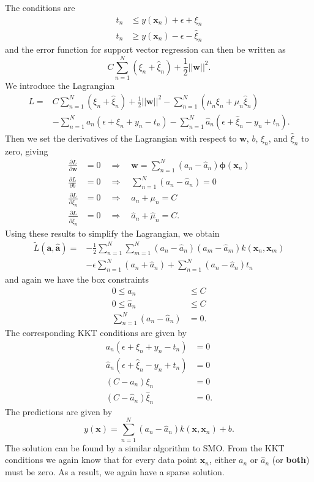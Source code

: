 \documentclass[a4paper]{book}
\renewcommand{\bf}{\mathbf}
\newcommand{\bs}{\boldsymbol}
\begin{document}
The conditions are
\begin{align}
	t_n &\leq y(\bf{x}_n) + \epsilon + \xi_n \\
	t_n &\geq y(\bf{x}_n) - \epsilon - \hat{\xi}_n
\end{align}
and the error function for support vector regression can then be written as
\begin{equation}
	C \sum_{n=1}^{N}(\xi_n + \hat{\xi}_n) + \frac{1}{2} ||\bf{w}||^2.
\end{equation}
We introduce the Lagrangian
\begin{align}
	L = & C \sum_{n=1}^N (\xi_n + \hat{\xi}_n) + \frac{1}{2} ||\bf{w}||^2 - \sum_{n=1}^N (\mu_n\xi_n + \hat{\mu}_n\hat{\xi}_n) \\
	 &- \sum_{n=1}^N a_n(\epsilon + \xi_n + y_n -t_n) - \sum_{n=1}^N \hat{a}_n(\epsilon+\hat{\xi}_n-y_n+t_n).
\end{align}
Then we set the derivatives of the Lagrangian with respect to $\bf{w}$, $b$, $\xi_n$, and $\hat{\xi}_n$ to zero, giving
\begin{align}
	\frac{\partial L}{\partial \bf{w}} &= 0 \quad \Rightarrow \quad \bf{w} = \sum_{n=1}^N (a_n-\hat{a}_n)\bs{\phi}(\bf{x}_n)\\
	\frac{\partial L}{\partial b} &=0 \quad \Rightarrow \quad \sum_{n=1}^N(a_n-\hat{a}_n) = 0 \\
	\frac{\partial L}{\partial \xi_n} &= 0 \quad \Rightarrow \quad a_n+\mu_n = C \\
	\frac{\partial L}{\partial \hat{\xi}_n} &= 0 \quad \Rightarrow \quad \hat{a}_n+\hat{\mu}_n = C.
\end{align}
Using these results to simplify the Lagrangian, we obtain
\begin{align}
	\tilde{L}(\bf{a},\hat{\bf{a}}) = &-\frac{1}{2} \sum_{n=1}^N \sum_{m=1}^N (a_n-\hat{a}_n)(a_m-\hat{a}_m)k(\bf{x}_n,\bf{x}_m) \\
	&- \epsilon \sum_{n=1}^N (a_n+\hat{a}_n) + \sum_{n=1}^N (a_n - \hat{a}_n)t_n
\end{align}
and again we have the box constraints
\begin{align}
	0 \leq a_n &\leq C \\
	0 \leq \hat{a}_n &\leq C \\
	\sum_{n=1}^N (a_n - \hat{a}_n) &= 0.
\end{align}
The corresponding KKT conditions are given by
\begin{align}
	a_n(\epsilon + \xi_n + y_n -t_n) &= 0\\
	\hat{a}_n(\epsilon + \hat{\xi}_n-y_n+t_n) &= 0\\
	(C - a_n)\xi_n &= 0\\
	(C - \hat{a}_n) \hat{\xi}_n &= 0.
\end{align}
The predictions are given by
\begin{equation}
	y(\bf{x}) = \sum_{n=1}^N (a_n - \hat{a}_n)k(\bf{x},\bf{x}_n) +b.
\end{equation}
The solution can be found by a similar algorithm to SMO. From the KKT conditions we again know that for every data point $\bf{x}_n$, either $a_n$ or $\hat{a}_n $ (or \textbf{both}) must be zero. As a result, we again have a sparse solution.
\end{document}
